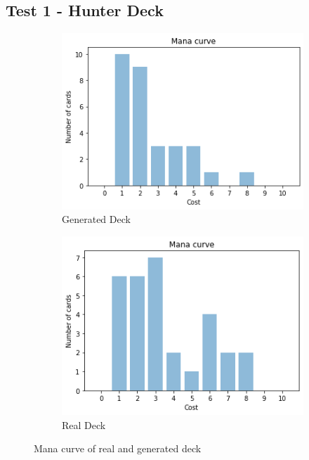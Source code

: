 \documentclass{report} %
\begin{document}
\subsection{Test 1 - Hunter Deck}
\begin{figure}[H]
\centering
\begin{subfigure}{.5\textwidth}
 \centering
 \includegraphics[width=.75\linewidth]{TestImages/HunterDeckManaCurveFake}
 \caption{Generated Deck}
\end{subfigure}%
\begin{subfigure}{.5\textwidth}
 \centering
 \includegraphics[width=.75\linewidth]{TestImages/HunterDeckManaCurveReal}
 \caption{Real Deck}
\end{subfigure}
\caption{Mana curve of real and generated deck}
\end{figure}
\end{document}
